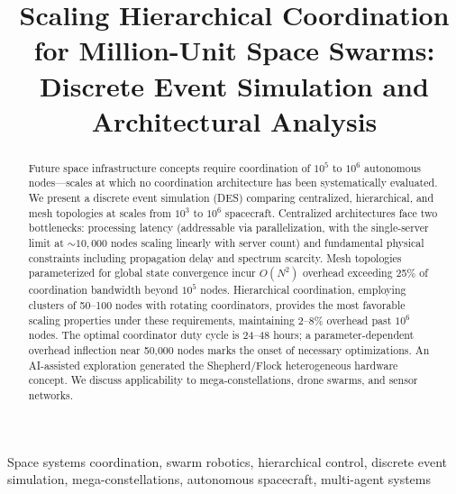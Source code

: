 \documentclass[journal]{IEEEtran}
\begin{document}
\title{Scaling Hierarchical Coordination for Million-Unit Space Swarms: Discrete Event Simulation and Architectural Analysis}

\author{
}


\maketitle

\begin{abstract}
Future space infrastructure concepts require coordination of $10^5$ to $10^6$ autonomous nodes---scales at which no coordination architecture has been systematically evaluated. We present a discrete event simulation (DES) comparing centralized, hierarchical, and mesh topologies at scales from $10^3$ to $10^6$ spacecraft. Centralized architectures face two bottlenecks: processing latency (addressable via parallelization, with the single-server limit at ${\sim}10{,}000$ nodes scaling linearly with server count) and fundamental physical constraints including propagation delay and spectrum scarcity. Mesh topologies parameterized for global state convergence incur $O(N^2)$ overhead exceeding 25\% of coordination bandwidth beyond $10^5$ nodes. Hierarchical coordination, employing clusters of 50--100 nodes with rotating coordinators, provides the most favorable scaling properties under these requirements, maintaining 2--8\% overhead past $10^6$ nodes. The optimal coordinator duty cycle is 24--48 hours; a parameter-dependent overhead inflection near 50{,}000 nodes marks the onset of necessary optimizations. An AI-assisted exploration generated the Shepherd/Flock heterogeneous hardware concept. We discuss applicability to mega-constellations, drone swarms, and sensor networks.
\end{abstract}

\begin{IEEEkeywords}
Space systems coordination, swarm robotics, hierarchical control, discrete event simulation, mega-constellations, autonomous spacecraft, multi-agent systems
\end{IEEEkeywords}

\end{document}

